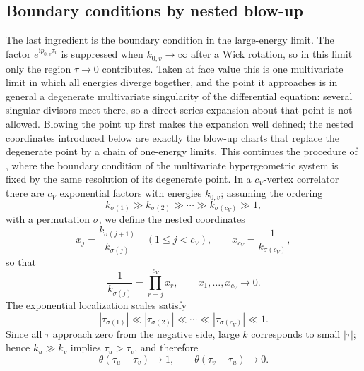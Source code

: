 \documentclass[11pt,a4paper]{article}
\newcommand{\ii}{\mathrm i}
\begin{document}
\subsection{Boundary conditions by nested blow-up}
\label{sec:boundary}
The last ingredient is the boundary condition in the large-energy limit. The factor
$e^{\ii p_{0,v}\tau_v}$ is suppressed when $k_{0,v}\to\infty$ after a Wick rotation, so in this
limit only the region $\tau\to0$ contributes. Taken at face value this is one multivariate limit in
which all energies diverge together, and the point it approaches is in general a degenerate
multivariate singularity of the differential equation: several singular divisors meet there, so a
direct series expansion about that point is not allowed. Blowing the point up first makes the
expansion well defined; the nested coordinates introduced below are exactly the blow-up charts
that replace the degenerate point by a chain of one-energy limits. This continues the procedure of
\cite{Chen:2024glu}, where the boundary condition of the multivariate hypergeometric system is
fixed by the same resolution of its degenerate point. In a $c_V$-vertex correlator there are $c_V$
exponential factors with energies $k_{0,v}$; assuming the ordering
\begin{equation}
  k_{\sigma(1)}\gg k_{\sigma(2)}\gg\cdots\gg k_{\sigma(c_V)}\gg1,
  \label{eq:energy-rank}
\end{equation}
with a permutation $\sigma$, we define the nested coordinates
\begin{equation}
  x_j=\frac{k_{\sigma(j+1)}}{k_{\sigma(j)}}\quad(1\leq j<c_V),
  \qquad
  x_{c_V}=\frac1{k_{\sigma(c_V)}},
  \label{eq:nested-blowup-coordinates}
\end{equation}
so that
\begin{equation}
 \frac{1}{k_{\sigma(j)}}=\prod_{r=j}^{c_V}x_r,
 \qquad x_1,\ldots,x_{c_V}\longrightarrow0.
 \label{eq:nested-energy-inverse}
\end{equation}
The exponential localization scales satisfy
\begin{equation}
|\tau_{\sigma(1)}|\ll|\tau_{\sigma(2)}|\ll\cdots
 \ll|\tau_{\sigma(c_V)}|\ll1.
 \label{eq:tau-rank}
\end{equation}
Since all $\tau$ approach zero from the negative side, large $k$ corresponds to small $|\tau|$;
hence $k_u\gg k_v$ implies $\tau_u>\tau_v$, and therefore
\begin{equation}
 \theta(\tau_u-\tau_v)\longrightarrow1,
 \qquad
 \theta(\tau_v-\tau_u)\longrightarrow0.
 \label{eq:theta-rank-rule}
\end{equation}
\end{document}
